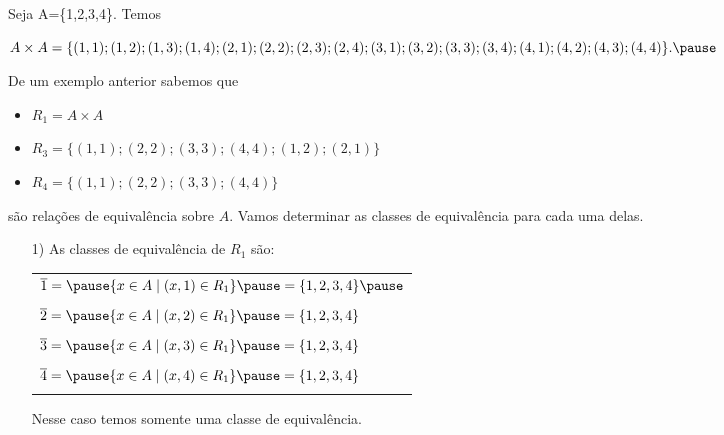 \documentclass{beamer}
\begin{document}
    \begin{frame}
        \begin{exemplos}
            Seja A=\{1,2,3,4\}. \pause Temos
            \begin{center}
                $A\times A = \{(1,1);(1,2);(1,3);(1,4);(2,1);(2,2);(2,3);\linebreak (2,4);(3,1);(3,2);(3,3);(3,4);(4,1);(4,2);(4,3);(4,4)\}.\pause$
            \end{center}
            De um exemplo anterior sabemos que
            \begin{itemize}
                \item $R_{1}= A\times A$\pause \vspace{.3cm}
                \item $R_{3}=\{(1,1);(2,2);(3,3);(4,4);(1,2);(2,1)\}$\pause \vspace{.3cm}
                \item $R_{4}=\{(1,1);(2,2);(3,3);(4,4)\}$\pause \vspace{.3cm}\pause \vspace{.3cm}
            \end{itemize}
            são relações de equivalência sobre $A$. \pause Vamos determinar as classes de equivalência para cada uma delas.\pause
        \end{exemplos}
    \end{frame}
    \begin{frame}
        \begin{exemplos}
            \begin{enumerate}
                \item[1)] As classes de equival\^encia de $R_1$ s\~ao:\pause
                \begin{center}
                    \begin{tabular}{l}
                        $\overline{1} = \pause \{x \in A \mid (x,1) \in R_1\} \pause = \{1,2,3,4\}\pause$\\ \\
                        $\overline{2} = \pause \{x \in A \mid (x,2) \in R_1\} \pause = \{1,2,3,4\}$\pause \\ \\
                        $\overline{3} = \pause \{x \in A \mid (x,3) \in R_1\} \pause = \{1,2,3,4\}$\pause \\ \\
                        $\overline{4} = \pause \{x \in A \mid (x,4) \in R_1\} \pause = \{1,2,3,4\}$\pause \\ \\
                    \end{tabular}
                \end{center}
                Nesse caso temos somente uma classe de equival\^encia.
            \end{enumerate}
        \end{exemplos}
    \end{frame}
\end{document}
